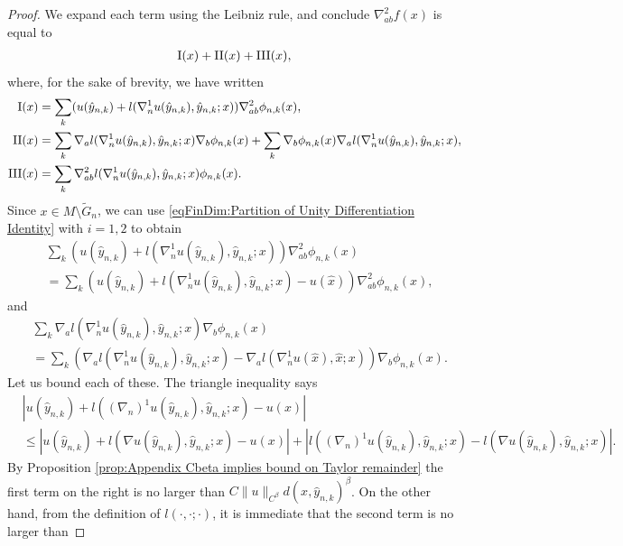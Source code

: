 \documentclass[11pt,reqno]{amsart}
\numberwithin{equation}{section}
\theoremstyle{plain}
\begin{document}
\begin{proof}
  We expand each term using the Leibniz rule, and conclude $\nabla^2_{ab}f(x)$ is equal to  
  \begin{align*}
    \textnormal{I}(x)+\textnormal{II}(x)+\textnormal{III}(x),
  \end{align*}
  where, for the sake of brevity, we have written
  \begin{align*}	
        \textnormal{I}(x) & = \sum \limits_{k} (u(\hat y_{n,k})+l( \nabla^1_n u (\hat y_{n,k}),\hat y_{n,k};x) )\nabla^2_{ab}\phi_{n,k}(x),\\
        \textnormal{II}(x) & = \sum \limits_{k} \nabla_a l( \nabla^1_n u (\hat y_{n,k}),\hat y_{n,k};x) \nabla_b \phi_{n,k}(x)+\sum \limits_{k} \nabla_b \phi_{n,k}(x) \nabla_a l( \nabla^1_n u (\hat y_{n,k}),\hat y_{n,k};x),\\					 	  
        \textnormal{III}(x) & =\sum \limits_{k} \nabla^2_{ab}l( \nabla^1_n u (\hat y_{n,k}),\hat y_{n,k};x) \phi_{n,k}(x).
  \end{align*}
  Since $x\in M \setminus \tilde G_n$, we can use \eqref{eqFinDim:Partition of Unity Differentiation Identity} with $i=1,2$ to obtain
  \begin{align*}
    & \sum \limits_{k} (u(\hat y_{n,k})+l( \nabla^1_n u (\hat y_{n,k}),\hat y_{n,k};x) )\nabla_{ab}^2\phi_{n,k}(x) \\
    & = \sum \limits_{k} (u(\hat y_{n,k})+l( \nabla^1_n u (\hat y_{n,k}),\hat y_{n,k};x) - u(\hat x) )\nabla_{ab}^2\phi_{n,k}(x),
  \end{align*}	
  and
  \begin{align*}
    & \sum \limits_{k} \nabla_a l( \nabla^1_n u (\hat y_{n,k}),\hat y_{n,k};x) \nabla_b \phi_{n,k}(x) \\
    & = \sum \limits_{k} \left (  \nabla_a l( \nabla^1_n u (\hat y_{n,k}),\hat y_{n,k};x) -\nabla_a l( \nabla^1_n u (\hat x),\hat x;x) \right ) \nabla_b \phi_{n,k}(x).
  \end{align*}  
  Let us bound each of these. The triangle inequality says
  \begin{align*}
    & |u(\hat y_{n,k})+l( (\nabla_n)^1u (\hat y_{n,k}),\hat y_{n,k};x)-u(x)|\\
    & \leq |u(\hat y_{n,k})+l( \nabla u (\hat y_{n,k}),\hat y_{n,k};x)-u(x)|+|l((\nabla_n)^1u (\hat y_{n,k}),\hat y_{n,k};x)-l( \nabla u (\hat y_{n,k}),\hat y_{n,k};x)|.
  \end{align*}	
  By Proposition \ref{prop:Appendix Cbeta implies bound on Taylor remainder} the first term on the right is no larger than $C\|u\|_{C^\beta}d(x,\hat y_{n,k})^\beta$. On the other hand, from the definition of $l(\cdot,\cdot;\cdot)$, it is immediate that the second term is no larger than

\end{proof}
\end{document}
